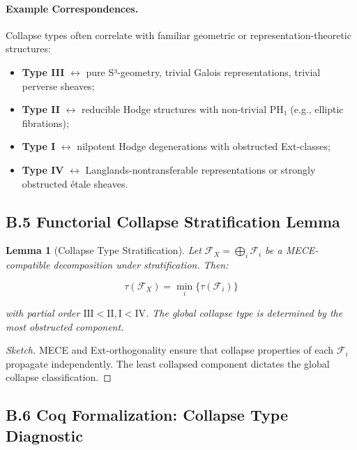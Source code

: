 \documentclass[11pt]{article}
\newtheorem{lemma}[theorem]{Lemma}
\begin{document}
\paragraph{Example Correspondences.}
Collapse types often correlate with familiar geometric or representation-theoretic structures:

\begin{itemize}
    \item \textbf{Type III} $\leftrightarrow$ pure S³-geometry, trivial Galois representations, trivial perverse sheaves;
    \item \textbf{Type II} $\leftrightarrow$ reducible Hodge structures with non-trivial PH₁ (e.g., elliptic fibrations);
    \item \textbf{Type I} $\leftrightarrow$ nilpotent Hodge degenerations with obstructed Ext-classes;
    \item \textbf{Type IV} $\leftrightarrow$ Langlands-nontransferable representations or strongly obstructed étale sheaves.
\end{itemize}


\subsection*{B.5 Functorial Collapse Stratification Lemma}

\begin{lemma}[Collapse Type Stratification]
Let \( \mathcal{F}_X = \bigoplus_i \mathcal{F}_i \) be a MECE-compatible decomposition under stratification. Then:

\[
\tau(\mathcal{F}_X) = \min_i \{ \tau(\mathcal{F}_i) \}
\]

with partial order \( \mathrm{III} < \mathrm{II}, \mathrm{I} < \mathrm{IV} \). The global collapse type is determined by the most obstructed component.

\end{lemma}

\begin{proof}[Sketch]
MECE and Ext-orthogonality ensure that collapse properties of each \( \mathcal{F}_i \) propagate independently. The least collapsed component dictates the global collapse classification.
\end{proof}

\subsection*{B.6 Coq Formalization: Collapse Type Diagnostic}
\end{document}
